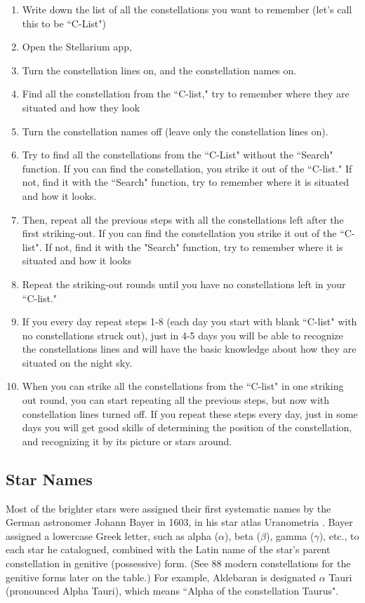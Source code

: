 \documentclass[a4paper,12pt]{extarticle}
\begin{document}
\begin{enumerate}[1.]
	\item Write down the list of all the constellations you want to remember (let's call this to be ``C-List")
	\item Open the Stellarium app,
	\item Turn the constellation lines on, and the constellation names on.
	\item Find all the constellation from the ``C-list," try to remember where they are situated and how they look
	\item Turn the constellation names off (leave only the constellation lines on).
	\item Try to find all the constellations from the ``C-List" without the ``Search" function. If you can find the constellation, you strike it out of the ``C-list." If not, find it with the ``Search" function, try to remember where it is situated and how it looks.
	\item Then, repeat all the previous steps with all the constellations left after the first striking-out. If you can find the constellation you strike it out of the ``C-list". If not, find it with the "Search" function, try to remember where it is situated and how it looks
	\item Repeat the striking-out rounds until you have no constellations left in your ``C-list."
	\item If you every day repeat steps 1-8 (each day you start with blank ``C-list" with no constellations struck out), just in 4-5 days you will be able to recognize the constellations lines and will have the basic knowledge about how they are situated on the night sky.
	\item When you can strike all the constellations from the ``C-list" in one striking out round, you can start repeating all the previous steps, but now with constellation lines turned off. If you repeat these steps every day, just in some days you will get good skills of determining the position of the constellation, and recognizing it by its picture or stars around.
	
\end{enumerate}

\subsection{Star Names}

Most of the brighter stars were assigned their first systematic names by the German astronomer Johann Bayer in 1603, in his star atlas Uranometria . Bayer assigned a lowercase Greek letter, such as alpha ($\alpha$), beta ($\beta$), gamma ($\gamma$), etc., to each star he catalogued, combined with the Latin name of the star’s parent constellation in genitive (possessive) form. (See 88 modern constellations for the genitive forms later on the table.) For example, Aldebaran is designated $\alpha$ Tauri (pronounced Alpha Tauri), which means ``Alpha of the constellation Taurus".\\
\end{document}
